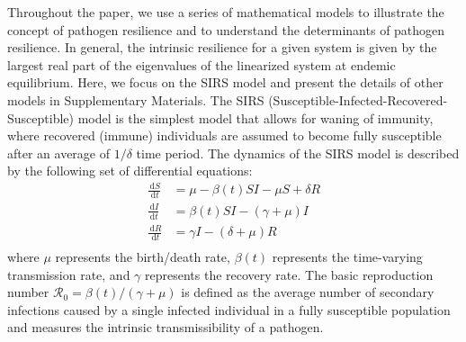 \documentclass[12pt]{article}
\newcommand{\dd}[1]{\ensuremath{\, \mathrm{d}#1}}
\begin{document}
Throughout the paper, we use a series of mathematical models to illustrate the concept of pathogen resilience and to understand the determinants of pathogen resilience.
In general, the intrinsic resilience for a given system is given by the largest real part of the eigenvalues of the linearized system at endemic equilibrium.
Here, we focus on the SIRS model and present the details of other models in Supplementary Materials.
The SIRS (Susceptible-Infected-Recovered-Susceptible) model is the simplest model that allows for waning of immunity, where recovered (immune) individuals are assumed to become fully susceptible after an average of $1/\delta$ time period.
The dynamics of the SIRS model is described by the following set of differential equations:
\begin{align}
\frac{\dd S}{\dd t} &= \mu - \beta(t) SI - \mu S + \delta R \\
\frac{\dd I}{\dd t} &= \beta(t) SI - (\gamma + \mu) I \\
\frac{\dd R}{\dd t} &= \gamma I - (\delta + \mu) R \\
\end{align}
where $\mu$ represents the birth/death rate, $\beta(t)$ represents the time-varying transmission rate, and $\gamma$ represents the recovery rate.
The basic reproduction number $\mathcal R_0 = \beta(t)/(\gamma + \mu)$ is defined as the average number of secondary infections caused by a single infected individual in a fully susceptible population and measures the intrinsic transmissibility of a pathogen.
\end{document}
